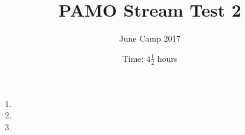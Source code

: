 \documentclass{article}
\title{PAMO Stream Test 2}
\author{June Camp 2017}
\date{Time: $4\frac{1}{2}$ hours}
\begin{document}
 \maketitle

\begin{enumerate}

\item %
	

\item %
	

\item %
	

\end{enumerate}
\end{document}
